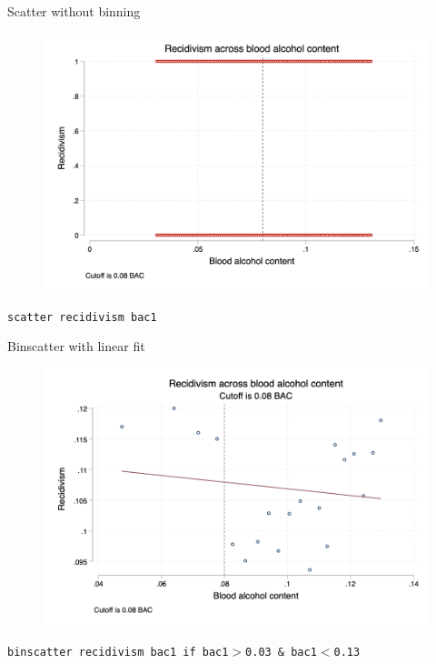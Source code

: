 \documentclass{beamer}
\begin{document}
\begin{frame}{Scatter without binning}

	\begin{figure}
	\includegraphics[scale=0.2]{./lecture_includes/hansen_scatter}
	\end{figure}

\texttt{scatter recidivism bac1}
	
	
\end{frame}

\begin{frame}{Binscatter with linear fit}

	\begin{figure}
	\includegraphics[scale=0.42]{./lecture_includes/hansen_binscatter}
	\end{figure}

\texttt{binscatter recidivism bac1 if bac1$>$0.03 \& bac1$<$0.13}
	
\end{frame}
\end{document}
